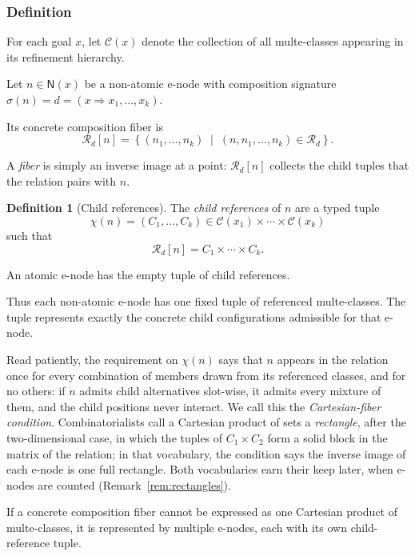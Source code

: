\documentclass[sigconf,nonacm]{acmart}
\theoremstyle{definition}
\newtheorem{definition}{Definition}[section]
\theoremstyle{plain}
\theoremstyle{remark}
\begin{document}
\subsubsection{Definition}
\label{sec:multe-graph-definition}

For each goal \(x\), let \(\mathcal C(x)\) denote the collection of
all multe-classes appearing in its refinement hierarchy.

Let \(n\in\mathsf N(x)\) be a non-atomic e-node with composition
signature \(\sigma(n) = d = (x\Rightarrow x_1,\ldots,x_k)\).

Its concrete composition fiber is
\[
\mathcal R_d[n]
=
\left\{
(n_1,\ldots,n_k)
\;\middle|\;
(n,n_1,\ldots,n_k)\in\mathcal R_d
\right\}.
\]

A \emph{fiber} is simply an inverse image at a point:
\(\mathcal R_d[n]\) collects the child tuples that the relation
pairs with \(n\).

\begin{definition}[Child references]
The \emph{child references} of \(n\) are a typed tuple
\[
\chi(n)
=
(C_1,\ldots,C_k)
\in
\mathcal C(x_1)\times\cdots\times\mathcal C(x_k)
\]
such that
\[
\mathcal R_d[n]
=
C_1\times\cdots\times C_k.
\]

An atomic e-node has the empty tuple of child references.
\end{definition}

Thus each non-atomic e-node has one fixed tuple of referenced
multe-classes.  The tuple represents exactly the concrete child
configurations admissible for that e-node.

Read patiently, the requirement on \(\chi(n)\) says that \(n\)
appears in the relation once for every combination of members drawn
from its referenced classes, and for no others: if \(n\) admits
child alternatives slot-wise, it admits every mixture of them, and
the child positions never interact.  We call this the
\emph{Cartesian-fiber condition}.  Combinatorialists call a
Cartesian product of sets a \emph{rectangle}, after the
two-dimensional case, in which the tuples of \(C_1\times C_2\) form
a solid block in the matrix of the relation; in that vocabulary, the
condition says the inverse image of each e-node is one full
rectangle.  Both vocabularies earn their keep later, when e-nodes
are counted (Remark~\ref{rem:rectangles}).

If a concrete composition fiber cannot be expressed as one Cartesian
product of multe-classes, it is represented by multiple e-nodes, each
with its own child-reference tuple.
\end{document}

